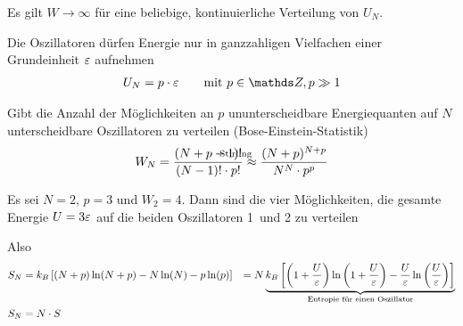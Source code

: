\begin{enumerate}
   Es gilt $W\to\infty$ für eine beliebige,
  kontinuierliche Verteilung von $U_N$.

  Die Oszillatoren dürfen Energie nur in ganzzahligen Vielfachen einer
  Grundeinheit $\varepsilon$ aufnehmen
  \begin{gather*}
    U_N = p\cdot \eps 
    \qquad \text{mit } p\in\Z, p\gg 1
  \end{gather*}

  Gibt die Anzahl der Möglichkeiten an $p$ ununterscheidbare
  Energiequanten auf $N$ unterscheidbare Oszillatoren zu verteilen
  (Bose-Einstein-Statistik)
  \begin{gather*}
    W_N = \frac{(N+p-1)!}{(N-1)!\cdot p!}
    \overset{\mathllap{\text{Stirling}}}{\approx} 
    \frac{(N+p)^{N+p}}{N^N \cdot p^p}
  \end{gather*}
  
  Es sei $N=2$, $p=3$ und $W_2=4$.
  Dann sind die vier Möglichkeiten, die gesamte Energie $U=3\varepsilon$ auf
  die beiden Oszillatoren 1~und 2 zu verteilen

  Also
  \begin{align*}
    S_N &= k_B \left[
      (N+p)\ln(N+p) - N\ln(N) - p\ln(p)
      \right]
    &= N \underbrace{
      k_B \left[
      \left(1+\frac{U}{\varepsilon}\right) \ln\left(1+\frac{U}{\varepsilon}\right) 
      - \frac{U}{\varepsilon}\ln\left(\frac{U}{\varepsilon}\right)
      \right]
      }_{\text{Entropie für einen Oszillator}}\\
    S_N &= N\cdot S
  \end{align*}
\end{enumerate}




